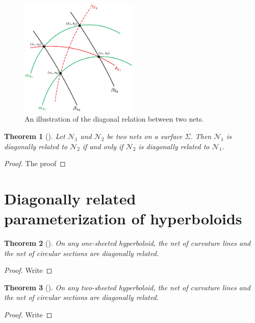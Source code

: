 \documentclass[10pt, a4paper]{article}
\theoremstyle{BoldTopSpacing}
\newtheorem{theorem}{Theorem}[section]
\theoremstyle{BoldTopSpacing}
\theoremstyle{BoldTopSpacing}
\theoremstyle{BoldTopBottomSpacing}
\theoremstyle{BoldTopSpacing}
\theoremstyle{BoldTopBottomSpacing}
\theoremstyle{remark}
\begin{document}
\begin{figure}[H]
    \centering
    \includegraphics[width=0.5\textwidth]{diagonally_related_diagram.png}
    \caption{An illustration of the diagonal relation between two nets.}
    \label{fig:diagonally-related-diagram}
\end{figure}

\begin{theorem}[]
\label{thm:symmetric-definition-diagonal-nets}
Let $\mathcal{N}_1$ and $\mathcal{N}_2$ be two nets on a surface $\Sigma$. Then $\mathcal{N}_1$ is diagonally related to
$\mathcal{N}_2$ if and only if $\mathcal{N}_2$ is diagonally related to $\mathcal{N}_1$.
\end{theorem}

\begin{proof}
    The proof
\end{proof}
\pagebreak
\section{Diagonally related parameterization of hyperboloids}
\begin{theorem}[]
\label{thm:diagonally-related-one-sheeted}
On any one-sheeted hyperboloid, the net of curvature lines and the net of circular sections are diagonally related.
\end{theorem}
\begin{proof}
    Write
\end{proof}

\begin{theorem}[]
\label{thm:diagonally-related-two-sheeted}
On any two-sheeted hyperboloid, the net of curvature lines and the net of circular sections are diagonally related.
\end{theorem}
\begin{proof}
    Write
\end{proof}
\pagebreak
\end{document}
